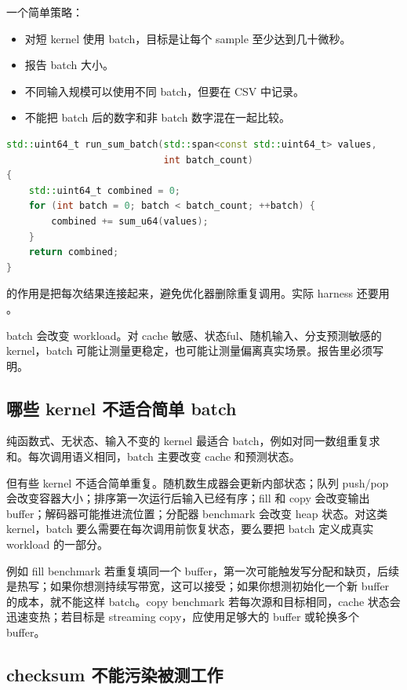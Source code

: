一个简单策略：

\begin{itemize}
  \item 对短 kernel 使用 batch，目标是让每个 sample 至少达到几十微秒。
  \item 报告 batch 大小。
  \item 不同输入规模可以使用不同 batch，但要在 CSV 中记录。
  \item 不能把 batch 后的数字和非 batch 数字混在一起比较。
\end{itemize}

\begin{lstlisting}[language=C++]
std::uint64_t run_sum_batch(std::span<const std::uint64_t> values,
                            int batch_count)
{
    std::uint64_t combined = 0;
    for (int batch = 0; batch < batch_count; ++batch) {
        combined += sum_u64(values);
    }
    return combined;
}
\end{lstlisting}

 的作用是把每次结果连接起来，避免优化器删除重复调用。实际 harness 还要用 。

\begin{warningbox}
batch 会改变 workload。对 cache 敏感、状态ful、随机输入、分支预测敏感的 kernel，batch 可能让测量更稳定，也可能让测量偏离真实场景。报告里必须写明。
\end{warningbox}

\subsection{哪些 kernel 不适合简单 batch}

纯函数式、无状态、输入不变的 kernel 最适合 batch，例如对同一数组重复求和。每次调用语义相同，batch 主要改变 cache 和预测状态。

但有些 kernel 不适合简单重复。随机数生成器会更新内部状态；队列 push/pop 会改变容器大小；排序第一次运行后输入已经有序；fill 和 copy 会改变输出 buffer；解码器可能推进流位置；分配器 benchmark 会改变 heap 状态。对这类 kernel，batch 要么需要在每次调用前恢复状态，要么要把 batch 定义成真实 workload 的一部分。

例如 fill benchmark 若重复填同一个 buffer，第一次可能触发写分配和缺页，后续是热写；如果你想测持续写带宽，这可以接受；如果你想测初始化一个新 buffer 的成本，就不能这样 batch。copy benchmark 若每次源和目标相同，cache 状态会迅速变热；若目标是 streaming copy，应使用足够大的 buffer 或轮换多个 buffer。

\subsection{checksum 不能污染被测工作}

